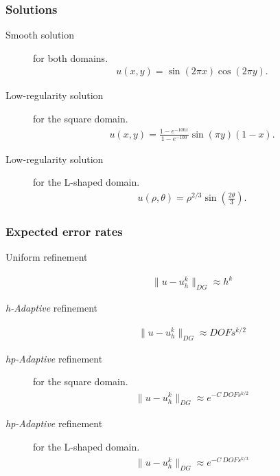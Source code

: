 \begin{frame}
    \frametitle{Solutions}

    \begin{description}
        \item[Smooth solution] for both domains.
            \begin{gather}
                u(x, y) = \sin(2 \pi x) \cos(2 \pi y).
            \end{gather}
        \item[Low-regularity solution] for the square domain. 
            \begin{gather}
                u(x, y) = \frac{1 - e^{-100x}}{1 - e^{-100}} \sin(\pi y) (1 - x).
            \end{gather}
        \item[Low-regularity solution] for the L-shaped domain.
            \begin{gather}
                u(\rho, \theta) = \rho^{2 / 3} \sin\left(\frac{2 \theta}{3}\right).
            \end{gather}
    \end{description}
\end{frame}

\begin{frame}
    \frametitle{Expected error rates}

    \begin{description}
        \item[Uniform refinement]
            \begin{gather}
                \lVert u - u_h^k \rVert_{DG} \approx h^{k} \label{uniform_trend}
            \end{gather}
        \item[\textit{h-Adaptive} refinement]
            \begin{gather}
                \lVert u - u_h^k \rVert_{DG} \approx DOFs^{k/2} \label{h_trend}
            \end{gather}
        \item[\textit{hp-Adaptive} refinement] for the square domain.
            \begin{gather}
                \lVert u - u_h^k \rVert_{DG} \approx e^{-C ~ DOFs^{k/2}} \label{square_hp_trend}
            \end{gather}
        \item[\textit{hp-Adaptive} refinement] for the L-shaped domain.
            \begin{gather}
                \lVert u - u_h^k \rVert_{DG} \approx e^{-C ~ DOFs^{k/3}} \label{lshape_hp_trend}
            \end{gather}
    \end{description}
\end{frame}

